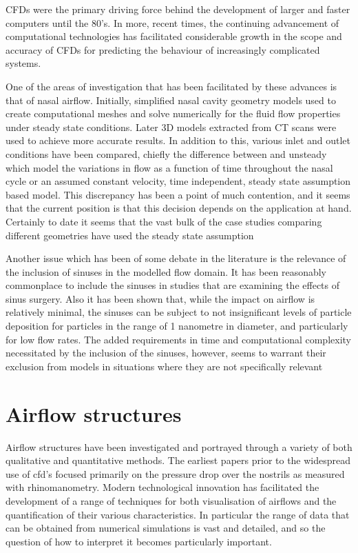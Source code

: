 CFDs were the primary driving force behind the development of larger and faster computers until the 80's\cite{Wendt2009}. In more, recent times, the continuing advancement of computational technologies has facilitated considerable growth in the scope and accuracy of CFDs for predicting the behaviour of increasingly complicated systems\cite{Tu2008}. 

One of the areas of investigation that has been facilitated by these advances is that of nasal airflow. Initially, simplified nasal cavity geometry models used to create computational meshes and solve numerically for the fluid flow properties under steady state conditions\cite{Keyhani1995, Hahn1993}. Later 3D models extracted from CT scans were used to achieve more accurate results\cite{Martonen2002}. In addition to this, various inlet and outlet conditions have been compared, chiefly the difference between and unsteady  which model the variations in flow as a function of time throughout the nasal cycle\cite{Shi2006} or an assumed constant velocity, time independent, steady state assumption based model\cite{Wen2008}. This discrepancy has been a point of much contention, and it seems that the current position is that this decision depends on the application at hand\cite{Doorly2008c}. Certainly to date it seems that the vast bulk of the case studies comparing different geometries have used the steady state assumption\cite{Xi2012, Zhu2011, Garcia2007}

Another issue which has been of some debate in the literature is the relevance of the inclusion of sinuses in the modelled flow domain. It has been reasonably commonplace to include the sinuses in studies that are examining the effects of sinus surgery\cite{Xiong2008a, Lindemann2005}. Also it has been shown that, while the impact on airflow is relatively minimal, the sinuses can be subject to not insignificant levels of particle deposition for particles in the range of 1 nanometre in diameter, and particularly for low flow rates\cite{Ge2012}. The added  requirements in time and computational complexity necessitated by the inclusion of the sinuses, however, seems to warrant their exclusion from models in situations where they are not specifically relevant\cite{Doorly2008c}



\section{Airflow structures}
Airflow structures have been investigated and portrayed through a variety of both qualitative and quantitative methods. The earliest papers prior to the widespread use of cfd's focused primarily on the pressure drop over the nostrils as measured with rhinomanometry\cite{Martin1981}. Modern technological innovation has facilitated the development of a range of techniques for both visualisation of airflows and the quantification of their various characteristics. In particular the range of data that can be obtained from numerical simulations is vast and detailed, and so the question of how to interpret it becomes particularly important.

